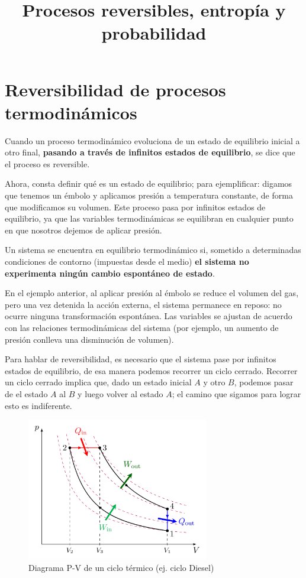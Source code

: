 \documentclass{article}
\title{Procesos reversibles, entropía y probabilidad}
\author{}
\date{}
\begin{document}
\maketitle

\section{Reversibilidad de procesos termodinámicos}
Cuando un proceso termodinámico evoluciona de un estado de equilibrio inicial a
otro final, \textbf{pasando a través de infinitos estados de equilibrio}, se
dice que el proceso es reversible.

Ahora, consta definir qué es un estado de equilibrio; para ejemplificar:
digamos que tenemos un émbolo y aplicamos presión a temperatura constante, de
forma que modificamos su volumen. Este proceso pasa por infinitos estados de
equilibrio, ya que las variables termodinámicas se equilibran en cualquier
punto en que nosotros dejemos de aplicar presión.

Un sistema se encuentra en equilibrio termodinámico si, sometido a
determinadas condiciones de contorno (impuestas desde el medio) \textbf{el
    sistema no experimenta ningún cambio espontáneo de estado}.

En el ejemplo anterior, al aplicar presión al émbolo se reduce el volumen del
gas, pero una vez detenida la acción externa, el sistema permanece en reposo:
no ocurre ninguna transformación espontánea. Las variables se ajustan de
acuerdo con las relaciones termodinámicas del sistema (por ejemplo, un aumento
de presión conlleva una disminución de volumen).

Para hablar de reversibilidad, es necesario que el sistema pase por infinitos
estados de equilibrio, de esa manera podemos recorrer un ciclo cerrado.
Recorrer un ciclo cerrado implica que, dado un estado inicial $A$ y otro $B$,
podemos pasar de el estado $A$ al $B$ y luego volver al estado $A$; el camino
que sigamos para lograr esto es indiferente.

\begin{figure}[H]
    \centering
    \includegraphics[width=300px]{Diagrama_PV_del_Ciclo_de_Diesel.svg.png}
    \caption{Diagrama P-V de un ciclo térmico (ej. ciclo Diesel)}
\end{figure}
\end{document}
